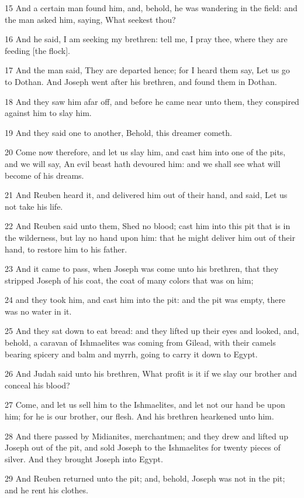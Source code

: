 \par 15 And a certain man found him, and, behold, he was wandering in the field: and the man asked him, saying, What seekest thou?
\par 16 And he said, I am seeking my brethren: tell me, I pray thee, where they are feeding [the flock].
\par 17 And the man said, They are departed hence; for I heard them say, Let us go to Dothan. And Joseph went after his brethren, and found them in Dothan.
\par 18 And they saw him afar off, and before he came near unto them, they conspired against him to slay him.
\par 19 And they said one to another, Behold, this dreamer cometh.
\par 20 Come now therefore, and let us slay him, and cast him into one of the pits, and we will say, An evil beast hath devoured him: and we shall see what will become of his dreams.
\par 21 And Reuben heard it, and delivered him out of their hand, and said, Let us not take his life.
\par 22 And Reuben said unto them, Shed no blood; cast him into this pit that is in the wilderness, but lay no hand upon him: that he might deliver him out of their hand, to restore him to his father.
\par 23 And it came to pass, when Joseph was come unto his brethren, that they stripped Joseph of his coat, the coat of many colors that was on him;
\par 24 and they took him, and cast him into the pit: and the pit was empty, there was no water in it.
\par 25 And they sat down to eat bread: and they lifted up their eyes and looked, and, behold, a caravan of Ishmaelites was coming from Gilead, with their camels bearing spicery and balm and myrrh, going to carry it down to Egypt.
\par 26 And Judah said unto his brethren, What profit is it if we slay our brother and conceal his blood?
\par 27 Come, and let us sell him to the Ishmaelites, and let not our hand be upon him; for he is our brother, our flesh. And his brethren hearkened unto him.
\par 28 And there passed by Midianites, merchantmen; and they drew and lifted up Joseph out of the pit, and sold Joseph to the Ishmaelites for twenty pieces of silver. And they brought Joseph into Egypt.
\par 29 And Reuben returned unto the pit; and, behold, Joseph was not in the pit; and he rent his clothes.

